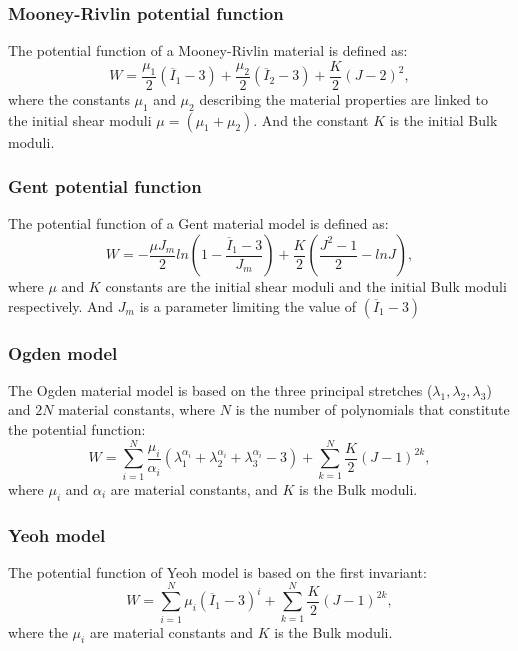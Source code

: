 \subsubsection*{Mooney-Rivlin potential function}
The potential function of a Mooney-Rivlin \citep{rivlin_large_1951} material is defined as:
\begin{equation}
\label{eq:mooneyRivlingmodel}
W=\frac{\mu_1}{2}(\overline{I}_1-3)+\frac{\mu_2}{2}(\overline{I}_2-3)+\frac{K}{2}(J-2)^2,
\end{equation}
where the constants $\mu_1$ and $\mu_2$ describing the material properties are linked to the initial shear moduli $\mu = (\mu_1+\mu_2)$. And the constant $K$ is the initial Bulk moduli. 

\subsubsection*{Gent potential function}
The potential function of a Gent \citep{gent_forms_1958} material model is defined as:
\begin{equation}
\label{gentmodel}
W=-\frac{\mu J_m}{2}ln\left(1-\frac{\overline{I}_1-3}{J_m}\right)+\frac{K}{2}\left(\frac{J^2-1}{2}-lnJ\right),
\end{equation}
 where $\mu$ and $K$ constants are the initial shear moduli and the initial Bulk moduli respectively. And $J_m$ is a parameter limiting the value of $(\overline{I}_1-3)$
\subsubsection*{Ogden model}
The Ogden \citep{ogden_large_1972} material model is based on the three principal stretches ($\lambda_1,\lambda_2,\lambda_3$) and $2N$ material constants, where $N$ is the number of polynomials that constitute the potential function:
\begin{equation}
\label{eq:ogdenmodel}
W= \sum^N_{i = 1} \frac{\mu_i}{\alpha_i}(\lambda_1^{\alpha_i}+\lambda_2^{\alpha_i}+\lambda_3^{\alpha_i}-3) + \sum_{k=1}^N \frac{K}{2}(J-1)^{2k},
\end{equation}
where $\mu_i$ and $\alpha_i$ are material constants, and $K$ is the Bulk moduli.

\subsubsection*{Yeoh model}
The potential function of Yeoh \citep{yeoh_characterization_1990} model is based on the first invariant:
\begin{equation}
\label{eq:yeohmodel}
W = \sum_{i=1}^N \mu_i(\overline{I}_1 - 3)^i + \sum_{k=1}^N \frac{K}{2}(J-1)^{2k},
\end{equation}
where the $\mu_i$ are material constants and $K$ is the Bulk moduli.

